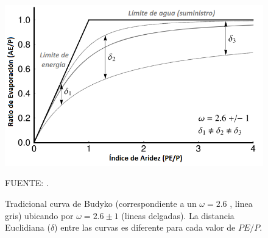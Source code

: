 \vspace{.25cm}
\begin{figure}[ht!]
\centering
	\includegraphics[scale=0.7]{Images/Greve2015_original_budyko.png}
	\caption{Tradicional curva de Budyko (correspondiente a un $\omega = 2.6$ \citep{Fu1981,Zhang2004}, linea gris) ubicando por $\omega = 2.6 \pm 1$ (lineas delgadas). La distancia Euclidiana ($\delta$) entre las curvas es diferente para cada valor de $PE/P$.}
	{\raggedright FUENTE: \citet{Greve2015}. \par}
	\label{fig:Greve01}
\end{figure}
